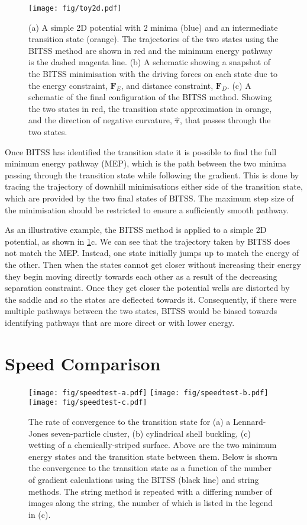 \documentclass[aps,twocolumn]{revtex4}
\begin{document}
\begin{figure}[htb]
  \centering
  \texttt{[image: fig/toy2d.pdf]}
  \caption{ 
    (a) A simple 2D potential with 2 minima (blue) and an intermediate transition state (orange). The trajectories of the two states using the BITSS method are shown in red and the minimum energy pathway is the dashed magenta line.
    (b) A schematic showing a snapshot of the BITSS minimisation with the driving forces on each state due to the energy constraint, $\bm{F}_E$, and distance constraint, $\bm{F}_D$.
    (c) A schematic of the final configuration of the BITSS method. Showing the two states in red, the transition state approximation in orange, and the direction of negative curvature, $\bm{\hat{\tau}}$, that passes through the two states.}
  \label{fig:toy2d}
\end{figure}

Once BITSS has identified the transition state it is possible to find the full minimum energy pathway (MEP), which is the path between the two minima passing through the transition state while following the gradient.
This is done by tracing the trajectory of downhill minimisations either side of the transition state, which are provided by the two final states of BITSS. The maximum step size of the minimisation should be restricted to ensure a sufficiently smooth pathway.

As an illustrative example, the BITSS method is applied to a simple 2D potential, as shown in \cref{fig:toy2d}c.
We can see that the trajectory taken by BITSS does not match the MEP. Instead, one state initially jumps up to match the energy of the other. Then when the states cannot get closer without increasing their energy they begin moving directly towards each other as a result of the decreasing separation constraint. Once they get closer the potential wells are distorted by the saddle and so the states are deflected towards it.
Consequently, if there were multiple pathways between the two states, BITSS would be biased towards identifying pathways that are more direct or with lower energy.


\section{Speed Comparison}
\begin{figure*}[htb]
  \centering
  \texttt{[image: fig/speedtest-a.pdf]}%
  \texttt{[image: fig/speedtest-b.pdf]}%
  \texttt{[image: fig/speedtest-c.pdf]}%
  \caption{The rate of convergence to the transition state for (a) a Lennard-Jones seven-particle cluster, (b) cylindrical shell buckling, (c) wetting of a chemically-striped surface. Above are the two minimum energy states and the transition state between them. Below is shown the convergence to the transition state as a function of the number of gradient calculations using the BITSS (black line) and string methods. The string method is repeated with a differing number of images along the string, the number of which is listed in the legend in (c).}
  \label{fig:speedtest}
\end{figure*}
\end{document}
